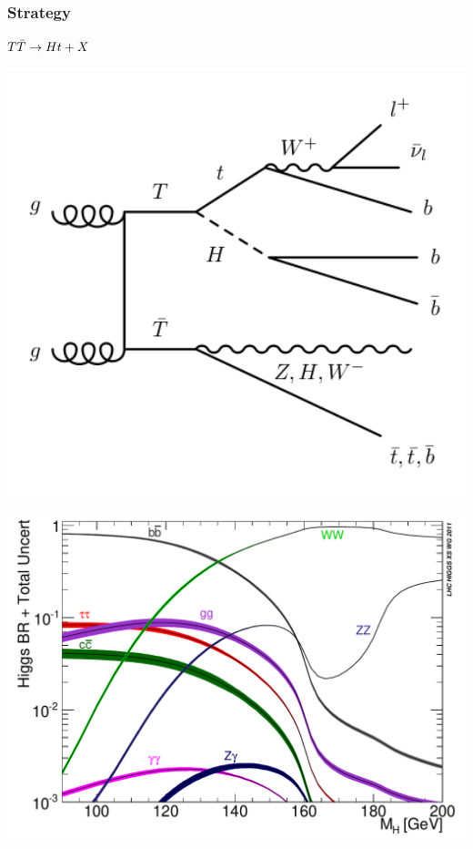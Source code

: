 \begin{frame}\frametitle{Strategy}
\centering\myskip

\begin{minipage}{.25\textwidth}\centering
\footnotesize

$\TTbar\to Ht+X$

\myskip

\includegraphics[width=1.15\textwidth]{pics/feyn_htX}

\includegraphics[width=1.15\textwidth]{pics/BRTotalUncertBands_lm}


\end{minipage}
\end{frame}
